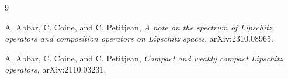 \documentclass[11pt]{article}
\begin{document}
\begin{thebibliography}{9}

A. Abbar, C. Coine, and C. Petitjean,
\emph{A note on the spectrum of Lipschitz operators and composition operators
on Lipschitz spaces}, arXiv:2310.08965.

A. Abbar, C. Coine, and C. Petitjean,
\emph{Compact and weakly compact Lipschitz operators}, arXiv:2110.03231.

\end{thebibliography}
\end{document}
